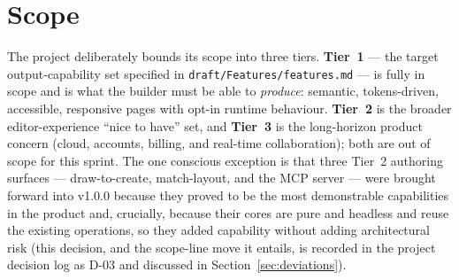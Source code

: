 \section{Scope}
The project deliberately bounds its scope into three tiers. \textbf{Tier~1} --- the
target output-capability set specified in \texttt{draft/Features/features.md} --- is
fully in scope and is what the builder must be able to \emph{produce}: semantic,
tokens-driven, accessible, responsive pages with opt-in runtime behaviour.
\textbf{Tier~2} is the broader editor-experience ``nice to have'' set, and
\textbf{Tier~3} is the long-horizon product concern (cloud, accounts, billing, and
real-time collaboration); both are out of scope for this sprint. The one conscious
exception is that three Tier~2 authoring surfaces --- draw-to-create,
match-layout, and the MCP server --- were brought forward into v1.0.0 because they
proved to be the most demonstrable capabilities in the product and, crucially,
because their cores are pure and headless and reuse the existing operations, so
they added capability without adding architectural risk (this decision, and the
scope-line move it entails, is recorded in the project decision log as D-03 and
discussed in Section~\ref{sec:deviations}).
